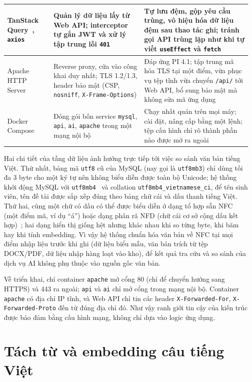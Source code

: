 \documentclass[../main.tex]{subfiles}
\begin{document}
{\begin{longtable}{|>{\raggedright\arraybackslash}p{2.9cm}|>{\raggedright\arraybackslash}p{5.2cm}|>{\raggedright\arraybackslash}p{6.2cm}|}
\hline
TanStack Query~\cite{tanstackquery}, \texttt{axios} & Quản lý dữ liệu lấy từ Web API; interceptor tự gắn JWT và xử lý tập trung lỗi \texttt{401} & Tự lưu đệm, gộp yêu cầu trùng, vô hiệu hóa dữ liệu đệm sau thao tác ghi; tránh gọi API trùng lặp như khi tự viết \texttt{useEffect} và \texttt{fetch} \\
\hline
Apache HTTP Server~\cite{apachemodproxy} & Reverse proxy, cửa vào công khai duy nhất; TLS 1.2/1.3, header bảo mật (CSP, \texttt{nosniff}, \texttt{X-Frame-Options}) & Đáp ứng PI 4.1; tập trung mã hóa TLS tại một điểm, vừa phục vụ tệp tĩnh vừa chuyển \texttt{/api/} tới Web API, bổ sung bảo mật mà không sửa mã ứng dụng \\
\hline
Docker Compose~\cite{dockercompose} & Đóng gói bốn service \texttt{mysql}, \texttt{api}, \texttt{ai}, \texttt{apache} trong một mạng nội bộ & Chạy nhất quán trên mọi máy; cài đặt, nâng cấp bằng một lệnh; tệp cấu hình chỉ rõ thành phần nào được mở ra ngoài \\
\hline
\end{longtable}
}

Hai chi tiết của tầng dữ liệu ảnh hưởng trực tiếp tới việc so sánh văn bản tiếng Việt. Thứ nhất, bảng mã \texttt{utf8} cũ của MySQL (nay gọi là \texttt{utf8mb3}) chỉ dùng tối đa 3 byte cho một ký tự nên không biểu diễn được toàn bộ Unicode; hệ thống khởi động MySQL với \texttt{utf8mb4}~\cite{mysqlutf8mb4} và collation \texttt{utf8mb4\_vietnamese\_ci}, để tên sinh viên, tên đề tài được sắp xếp đúng theo bảng chữ cái và dấu thanh tiếng Việt. Thứ hai, cùng một chữ có dấu có thể được biểu diễn ở dạng tổ hợp sẵn NFC (một điểm mã, ví dụ ``á'') hoặc dạng phân rã NFD (chữ cái cơ sở cộng dấu kết hợp)~\cite{unicodetr15}; hai dạng hiển thị giống hệt nhưng khác nhau khi so từng byte, khi băm hay khi tính embedding. Vì vậy hệ thống chuẩn hóa văn bản về NFC tại mọi điểm nhập liệu trước khi ghi (dữ liệu biểu mẫu, văn bản trích từ tệp DOCX/PDF, dữ liệu nhập hàng loạt vào kho), để kết quả tra cứu và so sánh của dịch vụ AI không phụ thuộc vào nguồn gốc văn bản.

Về triển khai, chỉ container \texttt{apache} mở cổng 80 (chỉ để chuyển hướng sang HTTPS) và 443 ra ngoài; \texttt{api} và \texttt{ai} chỉ mở cổng trong mạng nội bộ. Container \texttt{apache} có địa chỉ IP tĩnh, và Web API chỉ tin các header \texttt{X-Forwarded-For}, \texttt{X-Forwarded-Proto} đến từ đúng địa chỉ đó. Như vậy ranh giới tin cậy của kiến trúc được bảo đảm bằng cấu hình mạng, không chỉ dựa vào logic ứng dụng.

\section{Tách từ và embedding câu tiếng Việt}\label{sec:c1-nlp}
\end{document}

